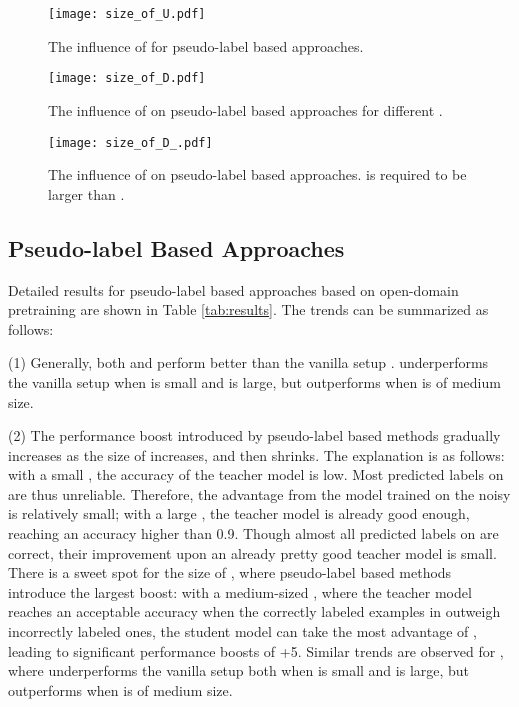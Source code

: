 \documentclass[11pt,a4paper]{article}
\begin{document}
\begin{figure}[t]
\center
  \texttt{[image: size\_of\_U.pdf]}
  \caption{The influence of   for pseudo-label based approaches.  }
  \label{fig-U-pseudo}
\end{figure}

\begin{figure*}[!ht]
  \texttt{[image: size\_of\_D.pdf]}
  \caption{The influence of  on pseudo-label based approaches for different .  }
  \label{fig:size_d}
\end{figure*}



\begin{figure*}[!ht]
  \texttt{[image: size\_of\_D\_.pdf]}
  \caption{The influence of  on pseudo-label based approaches.  is required to be larger than . }
  \label{fig:size_d_}
\end{figure*}


\subsection{Pseudo-label Based Approaches}
Detailed results for 
pseudo-label based approaches 
based on open-domain pretraining
are shown in Table \ref{tab:results}.
The  trends can be summarized as follows: 

(1) Generally, both  and  
perform better than  the vanilla setup .
 underperforms the vanilla setup  when  is small and  is large, 
but outperforms  when  is of medium size. 

(2) The performance boost 
introduced by pseudo-label based methods gradually increases as the size of  increases, and then shrinks.
The explanation is as follows:
with a small , the accuracy of the teacher model is low.
Most predicted labels on  are  thus unreliable. 
Therefore, 
the advantage from the model trained on the noisy  is relatively small;
with a large , the teacher model is already good enough, reaching an accuracy higher than 0.9. 
Though
almost all 
 predicted labels on  are  correct, their improvement upon an already pretty good teacher model is small.
 There is a sweet spot for the size of , where  pseudo-label based methods introduce the largest boost: 
 with a medium-sized , where the teacher model reaches an acceptable accuracy when the correctly labeled examples in 
outweigh incorrectly labeled ones, the student model can take the most advantage of , leading to significant performance boosts of +5. 
Similar trends are observed for , where  underperforms the vanilla setup  both when  is small and  is large, 
but outperforms  when  is of medium size. 
\end{document}

